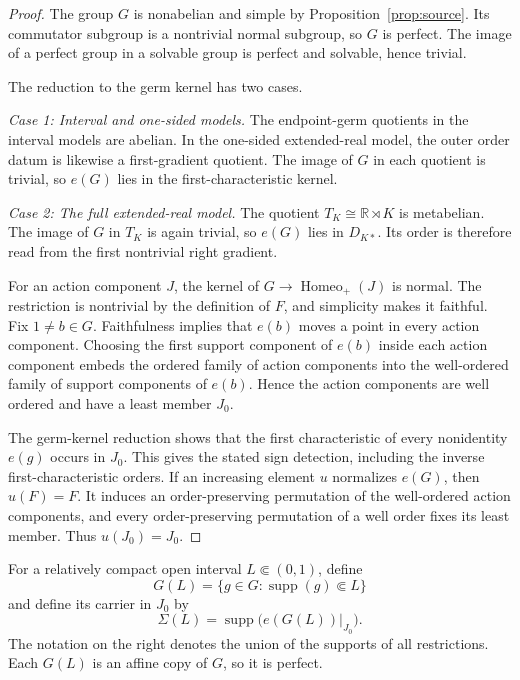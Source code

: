 \documentclass[11pt]{amsart}
\theoremstyle{definition}
\theoremstyle{remark}
\numberwithin{equation}{section}
\begin{document}
\begin{proof}
The group \(G\) is nonabelian and simple by Proposition~\ref{prop:source}. Its commutator subgroup is a nontrivial normal subgroup, so \(G\) is perfect. The image of a perfect group in a solvable group is perfect and solvable, hence trivial.

The reduction to the germ kernel has two cases.

\smallskip
\noindent\textit{Case 1: Interval and one-sided models.}
The endpoint-germ quotients in the interval models are abelian. In the one-sided extended-real model, the outer order datum is likewise a first-gradient quotient. The image of \(G\) in each quotient is trivial, so \(e(G)\) lies in the first-characteristic kernel.

\smallskip
\noindent\textit{Case 2: The full extended-real model.}
The quotient \(T_K\cong\mathbb R\rtimes K\) is metabelian. The image of \(G\) in \(T_K\) is again trivial, so \(e(G)\) lies in \(D_{K*}\). Its order is therefore read from the first nontrivial right gradient.

For an action component \(J\), the kernel of \(G\to\operatorname{Homeo}_+(J)\) is normal. The restriction is nontrivial by the definition of \(F\), and simplicity makes it faithful. Fix \(1\ne b\in G\). Faithfulness implies that \(e(b)\) moves a point in every action component. Choosing the first support component of \(e(b)\) inside each action component embeds the ordered family of action components into the well-ordered family of support components of \(e(b)\). Hence the action components are well ordered and have a least member \(J_0\).

The germ-kernel reduction shows that the first characteristic of every nonidentity \(e(g)\) occurs in \(J_0\). This gives the stated sign detection, including the inverse first-characteristic orders. If an increasing element \(u\) normalizes \(e(G)\), then \(u(F)=F\). It induces an order-preserving permutation of the well-ordered action components, and every order-preserving permutation of a well order fixes its least member. Thus \(u(J_0)=J_0\).
\end{proof}

For a relatively compact open interval \(L\Subset(0,1)\), define
\[
G(L)=\{g\in G:\operatorname{supp}(g)\Subset L\}
\]
and define its carrier in \(J_0\) by
\[
\Sigma(L)=
\operatorname{supp}\bigl(e(G(L))|_{J_0}\bigr).
\]
The notation on the right denotes the union of the supports of all restrictions. Each \(G(L)\) is an affine copy of \(G\), so it is perfect.
\end{document}
